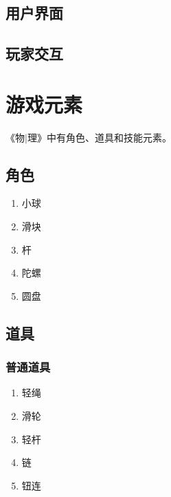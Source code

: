 \documentclass{tstextbook}
\begin{document}
\section{用户界面}



\section{玩家交互}


\chapter{游戏元素}

\begin{summary}
《物$|$理》中有角色、道具和技能元素。
\end{summary}

\section{角色}

\begin{enumerate}

\item{小球}

\item{滑块}

\item{杆}

\item{陀螺}

\item{圆盘}

\end{enumerate}

\section{道具}

\subsection{普通道具}

\begin{enumerate}

\item{轻绳}

\item{滑轮}

\item{轻杆}

\item{链}

\item{钮连}

\end{enumerate}
\end{document}
